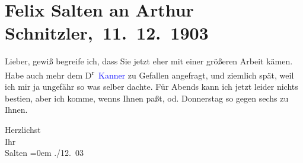 

\renewcommand{\erwaehntePersonen}{Personen: Heinrich Kanner}
\renewcommand{\erwaehnteOrte}{Orte: Wien}
\renewcommand{\erwaehnteWerke}{}
\section[ Felix Salten an Arthur Schnitzler, 11. 12. 1903]{Felix Salten an Arthur Schnitzler, 11. 12. 1903}
\nopagebreak{}
\rehead{ }\normalsize\beginnumbering{}
\toendnotes[C]{\smallbreak\pagebreak[2]}
\toendnotes[C]{\smallbreak}
\pstart
           \noindent{}{\pb}Lieber, gewiß begreife ich, dass Sie jetzt eher mit einer größeren
               Arbeit kämen. Habe auch mehr dem D\textsuperscript{r} \textcolor{blue}{Kanner}{}\ledrightnote{\textcolor{blue}{Heinrich Kanner}} zu Gefallen angefragt, und ziemlich spät, weil ich mir
               ja ungefähr so was selber dachte. Für Abends kann ich jetzt leider
               nichts besti{\geminationm}en, aber ich komme, wenns Ihnen paßt,
                  \label{K_L03356-1v}\label{K_L03356-1h} od. Donnerstag so gegen sechs zu Ihnen.\pend
           
\pstart
           Herzlichst {\\[\baselineskip]}Ihr {\\[\baselineskip]}\spacefill\mbox{Salten}\pend
           \leftskip=0em{}
./12. 03\pend
           \endnumbering{}  
      
